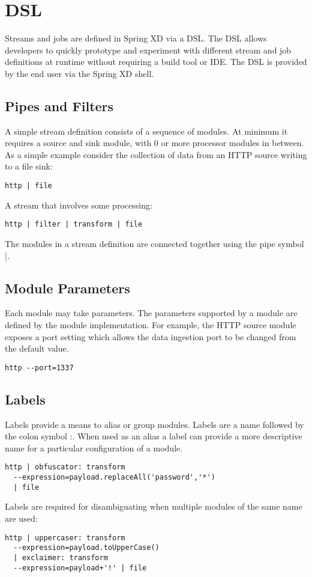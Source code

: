 \section{DSL}
\label{sec:DSL}
Streams and jobs are defined in Spring XD via a DSL\cite{dsl}. The DSL allows developers
to quickly prototype and experiment with different stream and job definitions at
runtime without requiring a build tool or IDE. The DSL is provided by the end user
via the Spring XD shell.

\subsection {Pipes and Filters}
A simple stream definition consists of a sequence of modules. At minimum it requires a
source and sink module, with 0 or more processor modules in between. As a simple example
consider the collection of data from an HTTP source writing to a file sink:

\begin{lstlisting}
http | file
\end{lstlisting}

A stream that involves some processing:

\begin{lstlisting}
http | filter | transform | file
\end{lstlisting}

The modules in a stream definition are connected together using the pipe symbol |.

\subsection{Module Parameters}
Each module may take parameters. The parameters supported by a module are defined by
the module implementation. For example, the HTTP source module exposes a port setting
which allows the data ingestion port to be changed from the default value.

\begin{lstlisting}
http --port=1337
\end{lstlisting}

\subsection{Labels}

Labels provide a means to alias or group modules. Labels are a name followed
by the colon symbol :. When used as an alias a label can provide a more descriptive
name for a particular configuration of a module.

\begin{lstlisting}
http | obfuscator: transform
  --expression=payload.replaceAll('password','*')
  | file
\end{lstlisting}

Labels are required for disambiguating when multiple modules of the same name are used:

\begin{lstlisting}
http | uppercaser: transform
  --expression=payload.toUpperCase()
  | exclaimer: transform
  --expression=payload+'!' | file
\end{lstlisting}

